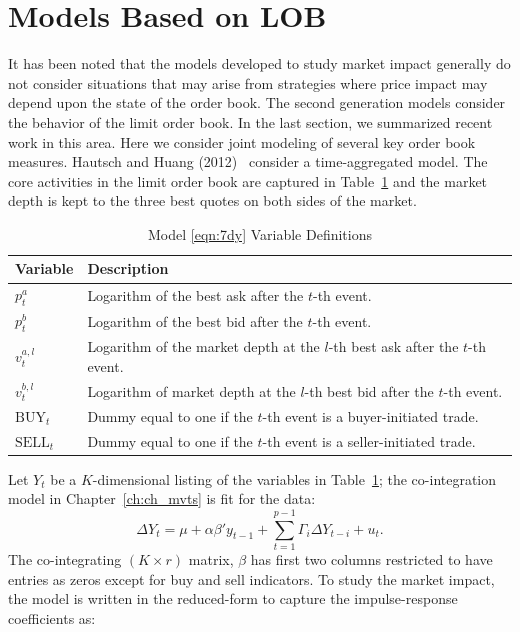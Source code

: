 \section{Models Based on LOB\label{sec:model_based_lob}}

It has been noted that the models developed to study market impact generally do not consider situations that may arise from strategies where price impact may depend upon the state of the order book. The second generation models consider the behavior of the limit order book. In the last section, we summarized recent work in this area. Here we consider joint modeling of several key order book measures. Hautsch and Huang (2012)~\cite{hauthuang} consider a time-aggregated model. The core activities in the limit order book are captured in Table~\ref{tab:vardef} and the market depth is kept to the three best quotes on both sides of the market.
	\begin{table}[!ht]
	\centering
	\caption{Model \eqref{eqn:7dy} Variable Definitions\label{tab:vardef}}
	\begin{tabular}{ll}
	Variable & Description \\ \hline
	$p_t^a$ & Logarithm of the best ask after the $t$-th event. \\
	$p_t^b$ & Logarithm of the best bid after the $t$-th event. \\
	$v_t^{a,l}$ & Logarithm of the market depth at the $l$-th best ask after the $t$-th event. \\
	$v_t^{b,l}$ & Logarithm of market depth at the $l$-th best bid after the $t$-th event. \\
	$\text{BUY}_t$ & Dummy equal to one if the $t$-th event is a buyer-initiated trade. \\
	$\text{SELL}_t$ & Dummy equal to one if the $t$-th event is a seller-initiated trade. 
	\end{tabular} 
	\end{table}
Let $Y_t$ be a $K$-dimensional listing of the variables in Table~\ref{tab:vardef}; the co-integration model in Chapter~\ref{ch:ch_mvts} is fit for the data:
	\begin{equation} \label{eqn:7dy}
	\Delta Y_t = \mu + \alpha \beta' y_{t-1} + \sum_{t=1}^{p-1} \Gamma_i \Delta Y_{t-i} + u_t.
	\end{equation}
The co-integrating $(K \times r)$ matrix, $\beta$ has first two columns restricted to have entries as zeros except for buy and sell indicators. To study the market impact, the model is written in the reduced-form to capture the impulse-response coefficients as:
